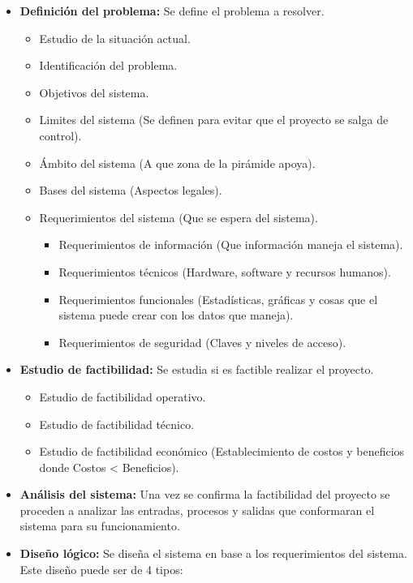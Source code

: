 \documentclass{templateNote}
\begin{document}
\begin{itemize}
    \item \textbf{Definición del problema:} Se define el problema a resolver.
        \begin{itemize}
            \item Estudio de la situación actual.
            \item Identificación del problema.
            \item Objetivos del sistema.
            \item Limites del sistema (Se definen para evitar que el proyecto se salga de control).
            \item Ámbito del sistema (A que zona de la pirámide apoya).
            \item Bases del sistema (Aspectos legales).
            \item Requerimientos del sistema (Que se espera del sistema).
                \begin{itemize}
                    \item Requerimientos de información (Que información maneja el sistema).
                    \item Requerimientos técnicos (Hardware, software y recursos humanos).
                    \item Requerimientos funcionales (Estadísticas, gráficas y cosas que el sistema puede crear con los datos que maneja).
                    \item Requerimientos de seguridad (Claves y niveles de acceso).
                \end{itemize}
        \end{itemize}
    \item \textbf{Estudio de factibilidad:} Se estudia si es factible realizar el proyecto.
        \begin{itemize}
            \item Estudio de factibilidad operativo.
            \item Estudio de factibilidad técnico.
            \item Estudio de factibilidad económico (Establecimiento de costos y beneficios donde Costos < Beneficios).
        \end{itemize}
    \item \textbf{Análisis del sistema:} Una vez se confirma la factibilidad del proyecto se proceden a analizar las entradas, procesos y salidas que conformaran el sistema para su funcionamiento.
    \item \textbf{Diseño lógico:} Se diseña el sistema en base a los requerimientos del sistema. Este diseño puede ser de 4 tipos:

\end{itemize}
\end{document}
